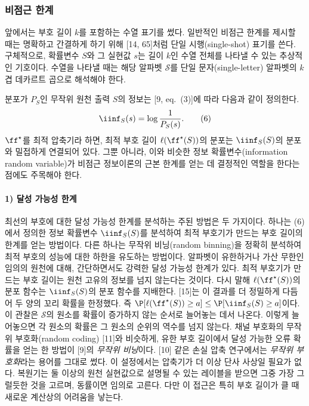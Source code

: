 \subsubsection{비점근 한계}

앞에서는 부호 길이 $k$를 포함하는 수열 표기를 썼다. 일반적인 비점근 한계를 제시할 때는 명확하고 간결하게 하기 위해 [14, 65]처럼 단일 시행(single-shot) 표기를 쓴다. 구체적으로, 확률변수 $S$와 그 실현값 $s$는 길이 $k$인 수열 전체를 나타낼 수 있는 추상적인 기호이다. 수열을 나타낼 때는 해당 알파벳 $\mathcal{S}$를 단일 문자(single-letter) 알파벳의 $k$겹 데카르트 곱으로 해석해야 한다.

분포가 $P_S$인 무작위 원천 출력 $S$의 정보는 [9, eq.~(3)]에 따라 다음과 같이 정의한다.
\begin{equation}
\iinf_S(s)=\log\frac{1}{P_S(s)}. \tag{6}
\end{equation}
$\ff^\star$를 최적 압축기라 하면, 최적 부호 길이 $\ell(\ff^\star(S))$의 분포는 $\iinf_S(S)$의 분포와 밀접하게 연결되어 있다. 그뿐 아니라, 이와 비슷한 정보 확률변수(information random variable)가 비점근 정보이론의 근본 한계를 얻는 데 결정적인 역할을 한다는 점에도 주목해야 한다.

\paragraph{1) 달성 가능성 한계}
최선의 부호에 대한 달성 가능성 한계를 분석하는 주된 방법은 두 가지이다. 하나는 (6)에서 정의한 정보 확률변수 $\iinf_S(S)$를 분석하여 최적 부호기가 만드는 부호 길이의 한계를 얻는 방법이다. 다른 하나는 무작위 비닝(random binning)을 정확히 분석하여 최적 부호의 성능에 대한 하한을 유도하는 방법이다. 알파벳이 유한하거나 가산 무한인 임의의 원천에 대해, 간단하면서도 강력한 달성 가능성 한계가 있다. 최적 부호기가 만드는 부호 길이는 원천 고유의 정보를 넘지 않는다는 것이다. 다시 말해 $\ell(\ff^\star(S))$의 분포 함수는 $\iinf_S(S)$의 분포 함수를 지배한다. [15]는 이 결과를 더 정밀하게 다듬어 두 양의 꼬리 확률을 한정했다. 즉 $\P[\ell(\ff^\star(S))\ge a]\le\P[\iinf_S(S)\ge a]$이다. 이 관찰은 $\mathcal{S}$의 원소를 확률이 증가하지 않는 순서로 늘어놓는 데서 나온다. 이렇게 늘어놓으면 각 원소의 확률은 그 원소의 순위의 역수를 넘지 않는다. 채널 부호화의 무작위 부호화(random coding) [11]와 비슷하게, 유한 부호 길이에서 달성 가능한 오류 확률을 얻는 한 방법이 [9]의 \emph{무작위 비닝}이다. [10] 같은 손실 압축 연구에서는 \emph{무작위 부호화}라는 용어를 그대로 썼다. 이 설정에서는 압축기가 더 이상 단사 사상일 필요가 없다. 복원기는 둘 이상의 원천 실현값으로 설명될 수 있는 레이블을 받으면 그중 가장 그럴듯한 것을 고르며, 동률이면 임의로 고른다. 다만 이 접근은 특히 부호 길이가 클 때 새로운 계산상의 어려움을 낳는다.

